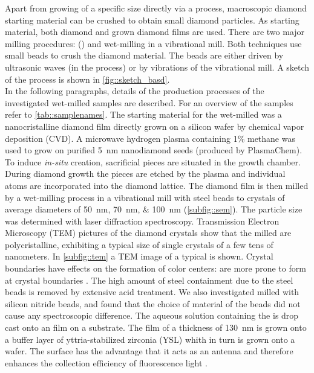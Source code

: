 	Apart from growing \nds of a specific size directly via a \CVD process, macroscopic diamond starting material can be crushed to obtain small diamond particles.
	As starting material, both \HPHT diamond and \CVD grown diamond films are used.
	There are two major milling procedures: \basd (\BASD) and wet-milling in a vibrational mill.
	Both techniques use small beads to crush the diamond material. 
	The beads are either driven by ultrasonic waves (in the \BASD process) or by vibrations of the vibrational mill.
	A sketch of the process is shown in \autoref{fig::sketch_basd}.
	\\
	In the following paragraphs, details of the production processes of the investigated wet-milled samples are described. 
	For an overview of the samples refer to \autoref{tab::samplenames}.
	The starting material for the wet-milled \nds was a nanocristalline diamond film \cite{Williams2006a} directly grown on a silicon wafer by chemical vapor deposition (CVD). 
	A microwave hydrogen plasma containing 1\% methane was used to grow on purified \SI{5}{\nano\meter} nanodiamond seeds (produced by PlasmaChem).
	To induce \textit{in-situ} \siv creation, sacrificial \Si pieces are situated in the growth chamber.
	During diamond growth the \Si pieces are etched by the plasma and individual atoms are incorporated into the diamond lattice.
	The diamond film is then milled by a wet-milling process in a vibrational mill with steel beads to crystals of average diameters of \SIlist{50; 70; 100}{\nano\meter} (\autoref{subfig::sem}).
	The particle size was determined with laser diffraction spectroscopy.
	Transmission Electron Microscopy (TEM) pictures of the diamond crystals show that the milled \nds are polycristalline, exhibiting a typical size of single crystals of a few tens of nanometers.
	In \autoref{subfig::tem} a TEM image of a typical \nd is shown.
	Crystal boundaries have effects on the formation of color centers:
	\sivs are more prone to form at crystal boundaries \cite{Zapol2001}.
	The high amount of steel containment due to the steel beads is removed by extensive acid treatment.
	We also investigated \nds milled with silicon nitride beads, and found that the choice of material of the beads did not cause any spectroscopic difference.
	The aqueous solution containing the \nds is drop cast onto an \ir film on a \Si substrate.
	The \ir film of a thickness of \SI{130}{nm} is grown onto a buffer layer of yttria-stabilized zirconia (YSL) whith in turn is grown onto a \Si wafer.
	The \ir surface has the advantage that it acts as an antenna and therefore enhances the collection efficiency of fluorescence light \cite{Neu2012a}.
